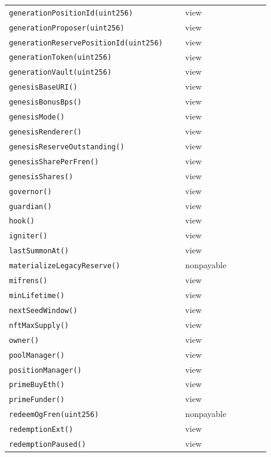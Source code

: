 \begin{longtable}{@{}p{0.62\linewidth}p{0.30\linewidth}@{}}
\texttt{\scriptsize generationPositionId(uint256)} & view \\
\texttt{\scriptsize generationProposer(uint256)} & view \\
\texttt{\scriptsize generationReservePositionId(uint256)} & view \\
\texttt{\scriptsize generationToken(uint256)} & view \\
\texttt{\scriptsize generationVault(uint256)} & view \\
\texttt{\scriptsize genesisBaseURI()} & view \\
\texttt{\scriptsize genesisBonusBps()} & view \\
\texttt{\scriptsize genesisMode()} & view \\
\texttt{\scriptsize genesisRenderer()} & view \\
\texttt{\scriptsize genesisReserveOutstanding()} & view \\
\texttt{\scriptsize genesisSharePerFren()} & view \\
\texttt{\scriptsize genesisShares()} & view \\
\texttt{\scriptsize governor()} & view \\
\texttt{\scriptsize guardian()} & view \\
\texttt{\scriptsize hook()} & view \\
\texttt{\scriptsize igniter()} & view \\
\texttt{\scriptsize lastSummonAt()} & view \\
\texttt{\scriptsize materializeLegacyReserve()} & nonpayable \\
\texttt{\scriptsize mifrens()} & view \\
\texttt{\scriptsize minLifetime()} & view \\
\texttt{\scriptsize nextSeedWindow()} & view \\
\texttt{\scriptsize nftMaxSupply()} & view \\
\texttt{\scriptsize owner()} & view \\
\texttt{\scriptsize poolManager()} & view \\
\texttt{\scriptsize positionManager()} & view \\
\texttt{\scriptsize primeBuyEth()} & view \\
\texttt{\scriptsize primeFunder()} & view \\
\texttt{\scriptsize redeemOgFren(uint256)} & nonpayable \\
\texttt{\scriptsize redemptionExt()} & view \\
\texttt{\scriptsize redemptionPaused()} & view \\

\end{longtable}
